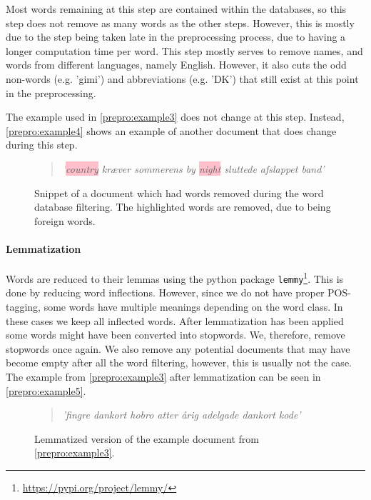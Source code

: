 Most words remaining at this step are contained within the databases, so this step does not remove as many words as the other steps.
However, this is mostly due to the step being taken late in the preprocessing process, due to having a longer computation time per word.
This step mostly serves to remove names, and words from different languages, namely English.
However, it also cuts the odd non-words (e.g. 'gimi') and abbreviations (e.g. 'DK') that still exist at this point in the preprocessing.

The example used in \autoref{prepro:example3} does not change at this step. 
Instead, \autoref{prepro:example4} shows an example of another document that does change during this step.

\begin{figure}[h]
	\begin{framed}
		\begin{quote}
			\textit{
				'\colorbox{pink}{country} kræver sommerens by \colorbox{pink}{night} sluttede afslappet band'
			}
		\end{quote}
	\end{framed}
	\caption{Snippet of a document which had words removed during the word database filtering. The highlighted words are removed, due to being foreign words.}
	\label{prepro:example4}
\end{figure}

\paragraph{Lemmatization}
Words are reduced to their lemmas using the python package \texttt{lemmy}\footnote{\url{https://pypi.org/project/lemmy/}}. 
This is done by reducing word inflections.
However, since we do not have proper POS-tagging, some words have multiple meanings depending on the word class.
In these cases we keep all inflected words.
After lemmatization has been applied some words might have been converted into stopwords.
We, therefore, remove stopwords once again.
We also remove any potential documents that may have become empty after all the word filtering, however, this is usually not the case.
The example from \autoref{prepro:example3} after lemmatization can be seen in \autoref{prepro:example5}.
\begin{figure}[h]
	\begin{framed}
		\begin{quote}
			\textit{
				'fingre dankort hobro atter årig adelgade dankort kode'
			}
		\end{quote}
	\end{framed}
	\caption{Lemmatized version of the example document from \autoref{prepro:example3}.}
	\label{prepro:example5}
\end{figure}


